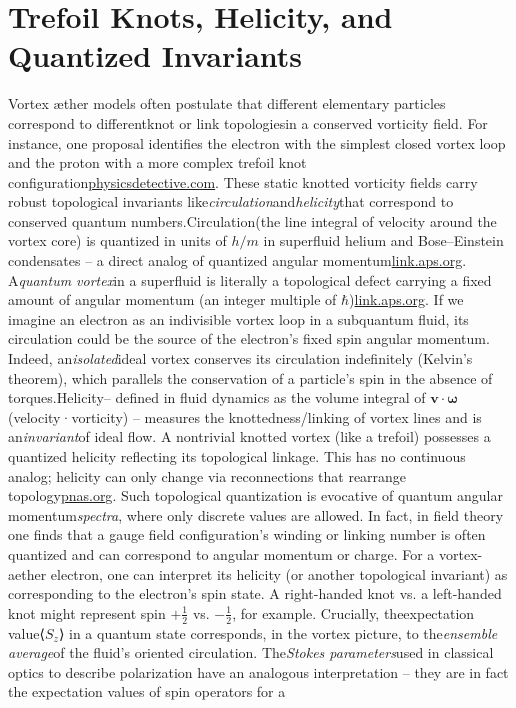 \section*{Trefoil Knots, Helicity, and Quantized Invariants}
Vortex æther models often postulate that different elementary particles correspond to differentknot or link topologiesin a conserved vorticity field. For instance, one proposal identifies the electron with the simplest closed vortex loop and the proton with a more complex trefoil knot configuration\href{https://physicsdetective.com/how-pair-production-works/#:~:text=,Image%E2%80%9C}{physicsdetective.com}. These static knotted vorticity fields carry robust topological invariants like\textit{circulation}and\textit{helicity}that correspond to conserved quantum numbers.Circulation(the line integral of velocity around the vortex core) is quantized in units of $h/m$ in superfluid helium and Bose–Einstein condensates – a direct analog of quantized angular momentum\href{https://link.aps.org/doi/10.1103/PhysRevResearch.3.033009#:~:text=Superfluid%20vortices%20are%20quantum%20excitations,Based%20on%20various}{link.aps.org}. A\textit{quantum vortex}in a superfluid is literally a topological defect carrying a fixed amount of angular momentum (an integer multiple of $\hbar$)\href{https://link.aps.org/doi/10.1103/PhysRevResearch.3.033009#:~:text=Superfluid%20vortices%20are%20quantum%20excitations,Based%20on%20various}{link.aps.org}. If we imagine an electron as an indivisible vortex loop in a subquantum fluid, its circulation could be the source of the electron’s fixed spin angular momentum. Indeed, an\textit{isolated}ideal vortex conserves its circulation indefinitely (Kelvin’s theorem), which parallels the conservation of a particle’s spin in the absence of torques.Helicity– defined in fluid dynamics as the volume integral of $\mathbf{v}\cdot\boldsymbol{\omega}$ (velocity·vorticity) – measures the knottedness/linking of vortex lines and is an\textit{invariant}of ideal flow. A nontrivial knotted vortex (like a trefoil) possesses a quantized helicity reflecting its topological linkage. This has no continuous analog; helicity can only change via reconnections that rearrange topology\href{https://www.pnas.org/doi/10.1073/pnas.1407232111#:~:text=,This%20process%20is}{pnas.org}. Such topological quantization is evocative of quantum angular momentum\textit{spectra}, where only discrete values are allowed. In fact, in field theory one finds that a gauge field configuration’s winding or linking number is often quantized and can correspond to angular momentum or charge. For a vortex-aether electron, one can interpret its helicity (or another topological invariant) as corresponding to the electron’s spin state. A right-handed knot vs. a left-handed knot might represent spin $+\tfrac{1}{2}$ vs. $-\tfrac{1}{2}$, for example. Crucially, theexpectation value⟨$S_z$⟩ in a quantum state corresponds, in the vortex picture, to the\textit{ensemble average}of the fluid’s oriented circulation. The\textit{Stokes parameters}used in classical optics to describe polarization have an analogous interpretation – they are in fact the expectation values of spin operators for a 